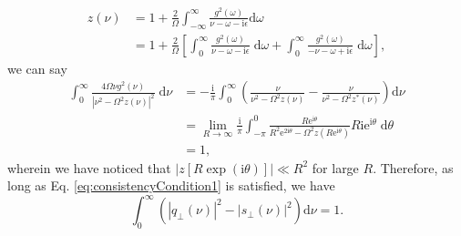 \begin{equation}
\begin{split}
z(\nu) &= 1 + \frac{2}{\Omega}\int_{-\infty}^\infty \frac{g^2(\omega)}{\nu - \omega - \mathrm{i}\epsilon}\mathrm{d}\omega\\
&= 1 + \frac{2}{\Omega}\left[\int_0^\infty \frac{g^2(\omega)}{\nu - \omega - \mathrm{i}\epsilon}\;\mathrm{d}\omega + \int^{\infty}_{0} \frac{g^2(\omega)}{-\nu - \omega + \mathrm{i}\epsilon}\;\mathrm{d}\omega\right],
\end{split}
\end{equation}
we can say
\begin{equation}
\begin{split}
\int_{0}^\infty\frac{4\Omega\nu g^2(\nu)}{|\nu^2 - \Omega^2z(\nu)|^2}\;\mathrm{d}\nu &= -\frac{\mathrm{i}}{\pi}\int_0^\infty\left(\frac{\nu}{\nu^2 - \Omega^2z(\nu)} - \frac{\nu}{\nu^2 - \Omega^2z^*(\nu)}\right)\mathrm{d}\nu\\
&= \lim_{R\to\infty}\frac{\mathrm{i}}{\pi}\int_{-\pi}^0\frac{R\mathrm{e}^{\mathrm{i}\theta}}{R^2\mathrm{e}^{2\mathrm{i}\theta} - \Omega^2z(R\mathrm{e}^{\mathrm{i}\theta})}R\mathrm{i}\mathrm{e}^{\mathrm{i}\theta}\;\mathrm{d}\theta\\
&= 1,
\end{split}
\end{equation}
wherein we have noticed that $|z[R\exp(\mathrm{i}\theta)]|\ll R^2$ for large $R$. Therefore, as long as Eq. \eqref{eq:consistencyCondition1} is satisfied, we have
\begin{equation}
\int_{0}^\infty\left(|q_\perp(\nu)|^2 - |s_\perp(\nu)|^2\right)\mathrm{d}\nu = 1.
\end{equation}

